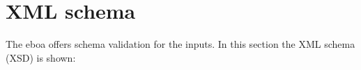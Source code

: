 \chapter{XML schema}\label{ap:xml_schema}

The \acrshort{eboa} offers schema validation for the inputs. In this section the XML schema (XSD) is shown:


